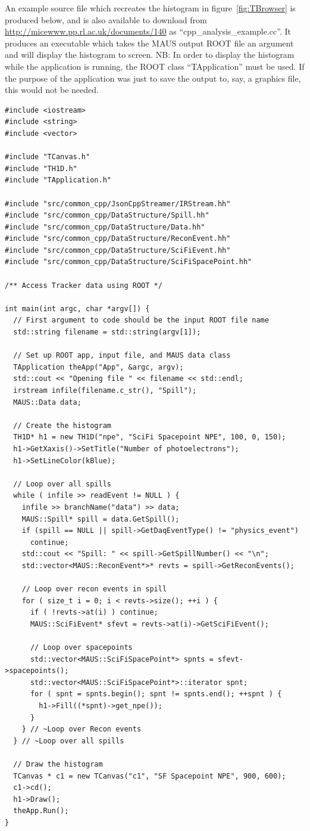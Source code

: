 \documentclass[a4paper,10pt]{article}
\begin{document}
  An example source file which recreates the histogram in figure~\ref{fig:TBrowser} is produced below, and is also available to download from \url{http://micewww.pp.rl.ac.uk/documents/140} as ``cpp\_analysis\_example.cc''. It produces an executable which takes the MAUS output ROOT file an argument and will display the histogram to screen.  NB: In order to display the histogram while the application is running, the ROOT class ``TApplication'' must be used. If the purpose of the application was just to save the output to, say, a graphics file, this would not be needed.

\lstset{style=customcpp}

  \begin{lstlisting}  
#include <iostream>
#include <string>
#include <vector>

#include "TCanvas.h"
#include "TH1D.h"
#include "TApplication.h"

#include "src/common_cpp/JsonCppStreamer/IRStream.hh"
#include "src/common_cpp/DataStructure/Spill.hh"
#include "src/common_cpp/DataStructure/Data.hh"
#include "src/common_cpp/DataStructure/ReconEvent.hh"
#include "src/common_cpp/DataStructure/SciFiEvent.hh"
#include "src/common_cpp/DataStructure/SciFiSpacePoint.hh"

/** Access Tracker data using ROOT */

int main(int argc, char *argv[]) {
  // First argument to code should be the input ROOT file name
  std::string filename = std::string(argv[1]);

  // Set up ROOT app, input file, and MAUS data class
  TApplication theApp("App", &argc, argv);
  std::cout << "Opening file " << filename << std::endl;
  irstream infile(filename.c_str(), "Spill");
  MAUS::Data data;

  // Create the histogram
  TH1D* h1 = new TH1D("npe", "SciFi Spacepoint NPE", 100, 0, 150);
  h1->GetXaxis()->SetTitle("Number of photoelectrons");
  h1->SetLineColor(kBlue);

  // Loop over all spills
  while ( infile >> readEvent != NULL ) {
    infile >> branchName("data") >> data;
    MAUS::Spill* spill = data.GetSpill();
    if (spill == NULL || spill->GetDaqEventType() != "physics_event")
      continue;
    std::cout << "Spill: " << spill->GetSpillNumber() << "\n";
    std::vector<MAUS::ReconEvent*>* revts = spill->GetReconEvents();

    // Loop over recon events in spill
    for ( size_t i = 0; i < revts->size(); ++i ) {
      if ( !revts->at(i) ) continue;
      MAUS::SciFiEvent* sfevt = revts->at(i)->GetSciFiEvent();

      // Loop over spacepoints
      std::vector<MAUS::SciFiSpacePoint*> spnts = sfevt->spacepoints();
      std::vector<MAUS::SciFiSpacePoint*>::iterator spnt;
      for ( spnt = spnts.begin(); spnt != spnts.end(); ++spnt ) {
        h1->Fill((*spnt)->get_npe());
      }
    } // ~Loop over Recon events
  } // ~Loop over all spills

  // Draw the histogram
  TCanvas * c1 = new TCanvas("c1", "SF Spacepoint NPE", 900, 600);
  c1->cd();
  h1->Draw();
  theApp.Run();
}
  \end{lstlisting}
\end{document}
